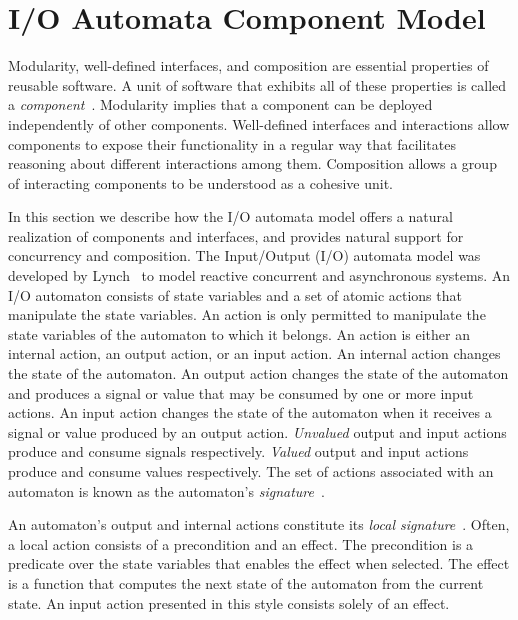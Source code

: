 \section{I/O Automata Component Model\label{component_model}}

Modularity, well-defined interfaces, and composition are essential properties of reusable software.
A unit of software that exhibits all of these properties is called a \emph{component}~\cite{szyperski2002component}.
Modularity implies that a component can be deployed independently of other components.
Well-defined interfaces and interactions allow components to expose their functionality in a regular way that facilitates reasoning about different interactions among them.
Composition allows a group of interacting components to be understood as a cohesive unit.

In this section we describe how the I/O automata model offers a natural realization of components and interfaces, and provides natural support for concurrency and composition.
The Input/Output (I/O) automata model was developed by Lynch~\cite{lynch1996distributed} to model reactive concurrent and asynchronous systems.
An I/O automaton consists of state variables and a set of atomic actions that manipulate the state variables.
An action is only permitted to manipulate the state variables of the automaton to which it belongs.
An action is either an internal action, an output action, or an input action.
An internal action changes the state of the automaton.
An output action changes the state of the automaton and produces a signal or value that may be consumed by one or more input actions.
An input action changes the state of the automaton when it receives a signal or value produced by an output action.
\emph{Unvalued} output and input actions produce and consume signals respectively.
\emph{Valued} output and input actions produce and consume values respectively.
The set of actions associated with an automaton is known as the automaton's \emph{signature}~\cite{lynch1996distributed}.

An automaton's output and internal actions constitute its \emph{local signature}~\cite{lynch1996distributed}.
Often, a local action consists of a precondition and an effect.
The precondition is a predicate over the state variables that enables the effect when selected.
The effect is a function that computes the next state of the automaton from the current state.
An input action presented in this style consists solely of an effect.

